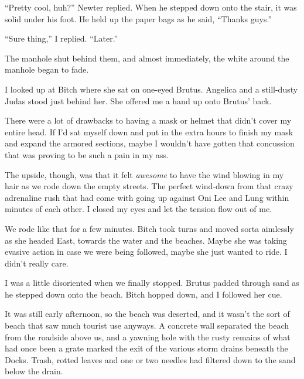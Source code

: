 ``Pretty cool, huh?'' Newter replied.  When he stepped down onto the stair, it was solid under his foot. He held up the paper bags as he said, ``Thanks guys.''



``Sure thing,'' I replied.  ``Later.''



The manhole shut behind them, and almost immediately, the white around the manhole began to fade.



I looked up at Bitch where she sat on one-eyed Brutus.  Angelica and a still-dusty Judas stood just behind her.  She offered me a hand up onto Brutus' back.



There were a lot of drawbacks to having a mask or helmet that didn't cover my entire head.  If I'd sat myself down and put in the extra hours to finish my mask and expand the armored sections, maybe I wouldn't have gotten that concussion that was proving to be such a pain in my ass.



The upside, though, was that it felt \emph{awesome} to have the wind blowing in my hair as we rode down the empty streets.  The perfect wind-down from that crazy adrenaline rush that had come with going up against Oni Lee and Lung within minutes of each other.  I closed my eyes and let the tension flow out of me.



We rode like that for a few minutes.  Bitch took turns and moved sorta aimlessly as she headed East, towards the water and the beaches.  Maybe she was taking evasive action in case we were being followed, maybe she just wanted to ride.  I didn't really care.



I was a little disoriented when we finally stopped.  Brutus padded through sand as he stepped down onto the beach.  Bitch hopped down, and I followed her cue.



It was still early afternoon, so the beach was deserted, and it wasn't the sort of beach that saw much tourist use anyways.  A concrete wall separated the beach from the roadside above us, and a yawning hole with the rusty remains of what had once been a grate marked the exit of the various storm drains beneath the Docks.  Trash, rotted leaves and one or two needles had filtered down to the sand below the drain.



